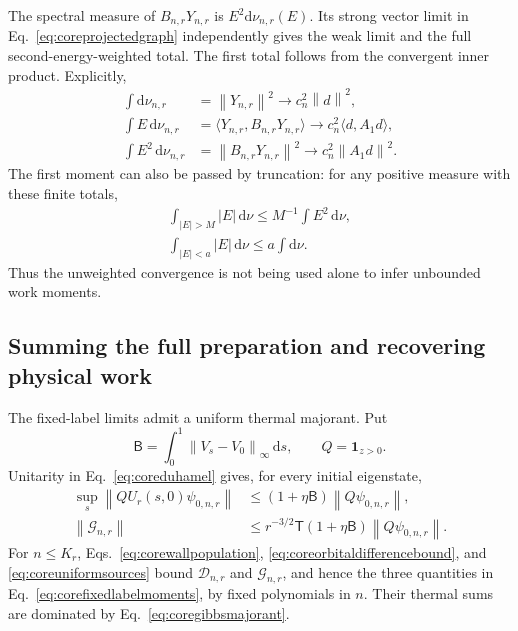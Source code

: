 \documentclass[aps,pra,reprint,superscriptaddress,longbibliography]{revtex4-2}
\newcommand{\dd}{\mathrm d}
\newcommand{\norm}[1]{\left\lVert#1\right\rVert}
\begin{document}
The spectral measure of $B_{n,r}Y_{n,r}$ is
$E^2\dd\nu_{n,r}(E)$. Its strong vector limit in
Eq.~\eqref{eq:coreprojectedgraph} independently gives the weak limit and
the full second-energy-weighted total. The first total follows from the
convergent inner product. Explicitly,
\begin{align}
 \int\dd\nu_{n,r}&=\norm{Y_{n,r}}^2\to c_n^2\norm d^2,\nonumber\\
 \int E\,\dd\nu_{n,r}
 &=\langle Y_{n,r},B_{n,r}Y_{n,r}\rangle
       \to c_n^2\langle d,A_1d\rangle,\nonumber\\
 \int E^2\,\dd\nu_{n,r}
 &=\norm{B_{n,r}Y_{n,r}}^2\to c_n^2\norm{A_1d}^2.
 \label{eq:corefixedlabelmoments}
\end{align}
The first moment can also be passed by truncation: for any positive
measure with these finite totals,
\begin{equation}
 \begin{gathered}
 \int_{|E|>M}|E|\,\dd\nu\le M^{-1}\int E^2\,\dd\nu,
 \\
 \int_{|E|<a}|E|\,\dd\nu\le a\int\dd\nu.
 \end{gathered}
 \label{eq:corefirstmomenttails}
\end{equation}
Thus the unweighted convergence is not being used alone to infer
unbounded work moments.

\subsection{Summing the full preparation and recovering physical work}

The fixed-label limits admit a uniform thermal majorant. Put
\begin{equation}
 \mathsf B=\int_0^1\norm{V_s-V_0}_\infty\,\dd s,
 \qquad Q=\mathbf1_{z>0}.
 \label{eq:corepathbudget}
\end{equation}
Unitarity in Eq.~\eqref{eq:coreduhamel} gives, for every initial
eigenstate,
\begin{align}
 \sup_s\norm{QU_r(s,0)\psi_{0,n,r}}
     &\le(1+\eta\mathsf B)\norm{Q\psi_{0,n,r}},\nonumber\\
 \norm{\mathcal G_{n,r}}
     &\le r^{-3/2}\mathsf T(1+\eta\mathsf B)
                              \norm{Q\psi_{0,n,r}}.
 \label{eq:coreuniformsources}
\end{align}
For $n\le K_r$, Eqs.~\eqref{eq:corewallpopulation},
\eqref{eq:coreorbitaldifferencebound}, and
\eqref{eq:coreuniformsources} bound $\mathcal D_{n,r}$ and
$\mathcal G_{n,r}$, and hence the three quantities in
Eq.~\eqref{eq:corefixedlabelmoments}, by fixed polynomials in $n$.
Their thermal sums are dominated by Eq.~\eqref{eq:coregibbsmajorant}.
\end{document}
